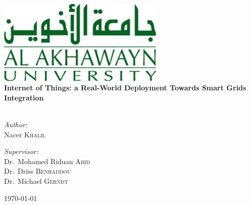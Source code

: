 \begin{titlepage}
\begin{center}
\includegraphics[width=0.6\textwidth]{img/aui_logo.jpg}
\linebreak
\linebreak
\linebreak
\HRule \\[0.4cm]
{ \huge \bfseries Internet of Things: a Real-World Deployment Towards Smart Grids Integration}\\[0.4cm]

\HRule \\[1.5cm]

\begin{minipage}{0.4\textwidth}
\begin{flushleft} \large
\emph{Author:}\\
Nacer \textsc{Khalil}
\end{flushleft}
\end{minipage}
\begin{minipage}{0.4\textwidth}
\begin{flushright} \large
\emph{Supervisor:} \\
Dr.~Mohamed Riduan \textsc{Abid} \\
Dr.~Driss \textsc{Benhaddou} \\
Dr.~Michael \textsc{Gerndt} 
\end{flushright}
\end{minipage}

\vfill

{\large \today}

\end{center}
\end{titlepage}
